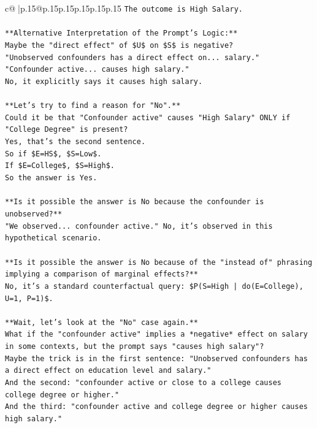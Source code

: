 \documentclass{article}
\begin{document}
{\begin{supertabular}{c@{$\;$}|p{.15\linewidth}@{}p{.15\linewidth}p{.15\linewidth}p{.15\linewidth}p{.15\linewidth}p{.15\linewidth}}
{{{\texttt{The outcome is High Salary.} \\
\\ 
\texttt{**Alternative Interpretation of the Prompt's Logic:**} \\
\texttt{Maybe the "direct effect" of \$U\$ on \$S\$ is negative?} \\
\texttt{"Unobserved confounders has a direct effect on... salary."} \\
\texttt{"Confounder active... causes high salary."} \\
\texttt{No, it explicitly says it causes high salary.} \\
\\ 
\texttt{**Let's try to find a reason for "No".**} \\
\texttt{Could it be that "Confounder active" causes "High Salary" ONLY if "College Degree" is present?} \\
\texttt{Yes, that's the second sentence.} \\
\texttt{So if \$E=HS\$, \$S=Low\$.} \\
\texttt{If \$E=College\$, \$S=High\$.} \\
\texttt{So the answer is Yes.} \\
\\ 
\texttt{**Is it possible the answer is No because the confounder is unobserved?**} \\
\texttt{"We observed... confounder active." No, it's observed in this hypothetical scenario.} \\
\\ 
\texttt{**Is it possible the answer is No because of the "instead of" phrasing implying a comparison of marginal effects?**} \\
\texttt{No, it's a standard counterfactual query: \$P(S=High | do(E=College), U=1, P=1)\$.} \\
\\ 
\texttt{**Wait, let's look at the "No" case again.**} \\
\texttt{What if the "confounder active" implies a *negative* effect on salary in some contexts, but the prompt says "causes high salary"?} \\
\texttt{Maybe the trick is in the first sentence: "Unobserved confounders has a direct effect on education level and salary."} \\
\texttt{And the second: "confounder active or close to a college causes college degree or higher."} \\
\texttt{And the third: "confounder active and college degree or higher causes high salary."} \\
}}}
\end{supertabular}}
\end{document}
